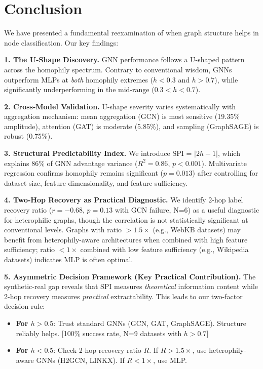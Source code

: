 
\section{Conclusion}
\label{sec:conclusion}

We have presented a fundamental reexamination of when graph structure helps in node classification. Our key findings:

\textbf{1. The U-Shape Discovery.} GNN performance follows a U-shaped pattern across the homophily spectrum. Contrary to conventional wisdom, GNNs outperform MLPs at \textit{both} homophily extremes ($h < 0.3$ and $h > 0.7$), while significantly underperforming in the mid-range ($0.3 < h < 0.7$).

\textbf{2. Cross-Model Validation.} U-shape severity varies systematically with aggregation mechanism: mean aggregation (GCN) is most sensitive (19.35\% amplitude), attention (GAT) is moderate (5.85\%), and sampling (GraphSAGE) is robust (0.75\%).

\textbf{3. Structural Predictability Index.} We introduce SPI = $|2h-1|$, which explains 86\% of GNN advantage variance ($R^2 = 0.86$, $p < 0.001$). Multivariate regression confirms homophily remains significant ($p = 0.013$) after controlling for dataset size, feature dimensionality, and feature sufficiency.

\textbf{4. Two-Hop Recovery as Practical Diagnostic.} We identify 2-hop label recovery ratio ($r = -0.68$, $p = 0.13$ with GCN failure, N=6) as a useful diagnostic for heterophilic graphs, though the correlation is not statistically significant at conventional levels. Graphs with ratio $> 1.5\times$ (e.g., WebKB datasets) may benefit from heterophily-aware architectures when combined with high feature sufficiency; ratio $< 1\times$ combined with low feature sufficiency (e.g., Wikipedia datasets) indicates MLP is often optimal.

\textbf{5. Asymmetric Decision Framework (Key Practical Contribution).} The synthetic-real gap reveals that SPI measures \textit{theoretical} information content while 2-hop recovery measures \textit{practical} extractability. This leads to our two-factor decision rule:
\begin{itemize}
    \item \textbf{For $h > 0.5$}: Trust standard GNNs (GCN, GAT, GraphSAGE). Structure reliably helps. [100\% success rate, N=9 datasets with $h > 0.7$]
    \item \textbf{For $h < 0.5$}: Check 2-hop recovery ratio $R$. If $R > 1.5\times$, use heterophily-aware GNNs (H2GCN, LINKX). If $R < 1\times$, use MLP.
\end{itemize}

